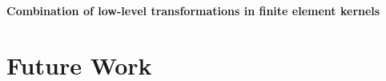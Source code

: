 \paragraph{Combination of low-level transformations in finite element kernels}

\section{Future Work}
%
%
